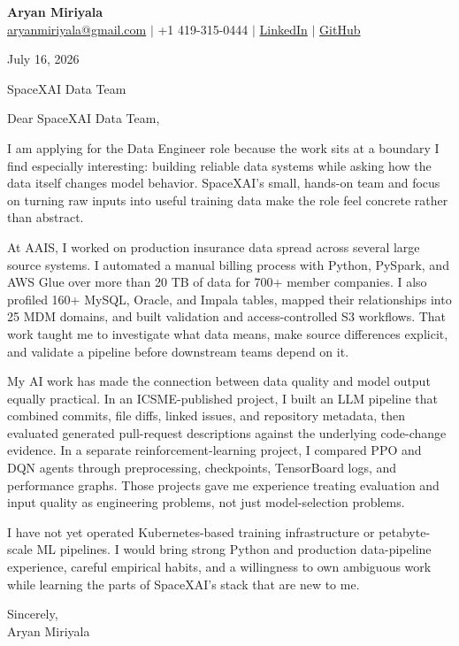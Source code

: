 \documentclass[letterpaper,11pt]{article}
\begin{document}
{\Large\textbf{Aryan Miriyala}}\\
\href{mailto:aryanmiriyala@gmail.com}{aryanmiriyala@gmail.com} $|$ +1 419-315-0444 $|$
\href{https://www.linkedin.com/in/aryan-miriyala-7788a21b6/}{LinkedIn} $|$
\href{https://github.com/aryanmiriyala}{GitHub}

July 16, 2026

SpaceXAI Data Team

Dear SpaceXAI Data Team,

I am applying for the Data Engineer role because the work sits at a boundary I find especially interesting: building reliable data systems while asking how the data itself changes model behavior. SpaceXAI's small, hands-on team and focus on turning raw inputs into useful training data make the role feel concrete rather than abstract.

At AAIS, I worked on production insurance data spread across several large source systems. I automated a manual billing process with Python, PySpark, and AWS Glue over more than 20 TB of data for 700+ member companies. I also profiled 160+ MySQL, Oracle, and Impala tables, mapped their relationships into 25 MDM domains, and built validation and access-controlled S3 workflows. That work taught me to investigate what data means, make source differences explicit, and validate a pipeline before downstream teams depend on it.

My AI work has made the connection between data quality and model output equally practical. In an ICSME-published project, I built an LLM pipeline that combined commits, file diffs, linked issues, and repository metadata, then evaluated generated pull-request descriptions against the underlying code-change evidence. In a separate reinforcement-learning project, I compared PPO and DQN agents through preprocessing, checkpoints, TensorBoard logs, and performance graphs. Those projects gave me experience treating evaluation and input quality as engineering problems, not just model-selection problems.

I have not yet operated Kubernetes-based training infrastructure or petabyte-scale ML pipelines. I would bring strong Python and production data-pipeline experience, careful empirical habits, and a willingness to own ambiguous work while learning the parts of SpaceXAI's stack that are new to me.

Sincerely,\\
Aryan Miriyala
\end{document}
